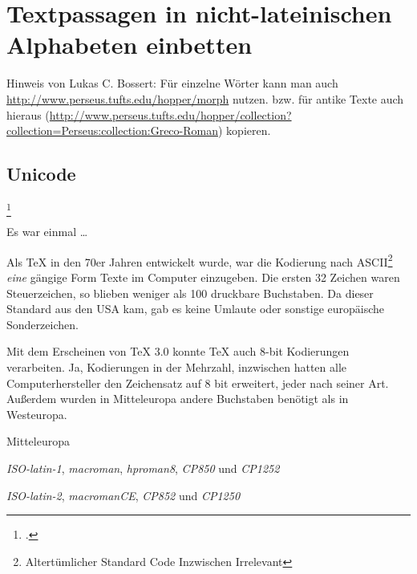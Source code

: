 \chapter{Textpassagen in nicht-lateinischen Alphabeten einbetten}

Hinweis von Lukas C. Bossert:
Für einzelne Wörter kann man auch \url{http://www.perseus.tufts.edu/hopper/morph} nutzen.
bzw. für antike Texte auch hieraus (\url{http://www.perseus.tufts.edu/hopper/collection?collection=Perseus:collection:Greco-Roman}) kopieren.

\section{Unicode}
\footcite{kielhorn:dtk2014}


\noindent Es war einmal \dots

Als \TeX{} in den 70er Jahren entwickelt wurde, war die Kodierung nach 
ASCII\footnote{Altertümlicher Standard Code Inzwischen Irrelevant} \emph{eine}
gängige Form Texte im Computer einzugeben. 
Die ersten 32 Zeichen waren Steuerzeichen, so blieben weniger als 100 druckbare Buchstaben.
Da dieser Standard aus den USA kam, gab es keine Umlaute oder sonstige europäische
Sonderzeichen.

Mit dem Erscheinen von \TeX{} 3.0 konnte \TeX{} auch 8-bit Kodierungen verarbeiten.
Ja, Kodierungen in der Mehrzahl, inzwischen hatten alle Computerhersteller den Zeichensatz
auf 8 bit erweitert, jeder nach seiner Art. Außerdem wurden in Mitteleuropa andere Buchstaben
benötigt als in Westeuropa.

\begin{labeling}{Mitteleuropa}
    \item[Westeuropa:]
      \emph{ISO-latin-1}, \emph{macroman}, \emph{hproman8}, \emph{CP850} und \emph{CP1252}
    \item[Mitteleuropa:]
      \emph{ISO-latin-2}, \emph{macromanCE}, \emph{CP852} und \emph{CP1250}
\end{labeling}

